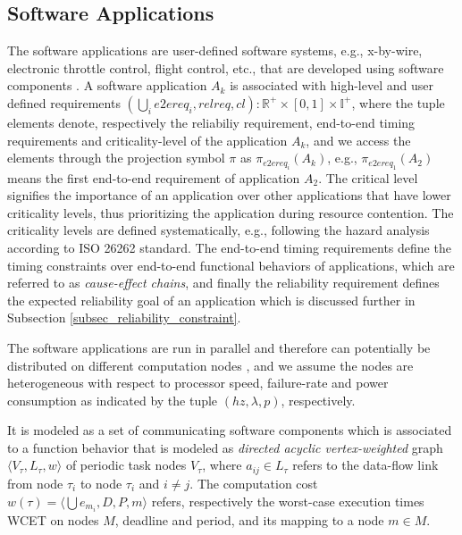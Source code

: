 \subsection{Software Applications}
The software applications are user-defined software systems, e.g., x-by-wire, electronic throttle control, flight control, etc., that are developed using software components \cite{softwarecomponents}\cite{Crnkovic2002BuildingSystems}. A software application $A_k$ is associated with high-level and user defined requirements $(\bigcup_i e2ereq_i,relreq,cl):\mathbb{R}^+\times [0,1]\times \mathbb{I}^+$, where the tuple elements denote, respectively the reliabiliy requirement, end-to-end timing requirements and criticality-level of the application $A_k$, and we access the elements through the projection symbol $\pi$ as $\pi_{e2ereq_i}(A_k)$, e.g., $\pi_{e2ereq_1}(A_2)$ means the first end-to-end requirement of application $A_2$. The critical level signifies the importance of an application over other applications that have lower criticality levels, thus prioritizing the application during resource contention. The criticality levels are defined systematically, e.g., following the hazard analysis according to ISO 26262 standard. The end-to-end timing requirements define the timing constraints over end-to-end functional behaviors of applications, which are referred to as \textit{cause-effect chains}, and finally the reliability requirement defines the expected reliability goal of an application which is discussed further in Subsection \ref{subsec_reliability_constraint}. 

The software applications are run in parallel and therefore can potentially be distributed on different computation nodes , and we assume the nodes are heterogeneous with respect to processor speed, failure-rate and power consumption as indicated by the tuple $(hz, \lambda, p)$, respectively. 

\begin{definition}
It is modeled as a set of communicating software components which is associated to a function behavior that is modeled as \textit{directed acyclic vertex-weighted} graph $\langle V_\tau,L_\tau, w\rangle$ of periodic task nodes $V_\tau$, where $a_{ij}\in L_\tau$ refers to the data-flow link from node $\tau_i$ to node $\tau_i$ and $i \neq j$. The computation cost $w(\tau)=\langle \bigcup e_{m_i},D,P, m\rangle$ refers, respectively the worst-case execution times {WCET} on nodes $M$, deadline and period, and its mapping to a node $m\in M$.
\end{definition}%

